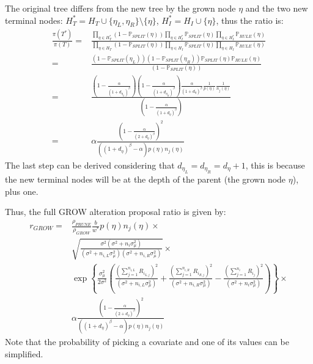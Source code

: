 \documentclass[11pt,a4paper]{article}
\newcommand{\prob}{\mathbb{P}}
\begin{document}
The original tree differs from the new tree by the grown node $\eta$ and the two new terminal nodes: $H_T^* = H_T \cup \{\eta_L, \eta_R\} \setminus \{\eta\}$, $H_I^* = H_I \cup \{\eta\}$, thus the ratio is:
\begin{equation}
    \label{eq:grow_struct_ratio}
    \begin{split}
        \frac{\pi(T^*)}{\pi(T)} = & \frac{\prod_{\eta \in H_T^*} (1 - \prob_{SPLIT}(\eta)) \prod_{\eta \in H_I^*} \prob_{SPLIT}(\eta)\prod_{\eta \in H_I^*} \prob_{RULE}(\eta)}{\prod_{\eta \in H_T} (1 - \prob_{SPLIT}(\eta)) \prod_{\eta \in H_I} \prob_{SPLIT}(\eta)\prod_{\eta \in H_I} \prob_{RULE}(\eta)} \\
        =                         & \frac{(1-\prob_{SPLIT}(\eta_L))(1-\prob_{SPLIT}(\eta_R))\prob_{SPLIT}(\eta)\prob_{RULE}(\eta)}{(1-\prob_{SPLIT}(\eta))}                                                                                                                                                     \\
        =                         & \frac{\left(1 - \frac{\alpha}{(1 + d_{\eta_L})^\beta}\right)\left(1 - \frac{\alpha}{(1 + d_{\eta_R})^\beta}\right)\frac{\alpha}{(1 + d_{\eta})^\beta}\frac{1}{p(\eta)}\frac{1}{n_j(\eta)}}{\left(1 - \frac{\alpha}{(1 + d_{\eta})^\beta}\right)}                            \\
        =                         & \alpha \frac{\left(1 - \frac{\alpha}{(2 + d_{\eta})^\beta}\right)^2}{\left((1+d_\eta)^\beta - \alpha\right) p(\eta) n_j(\eta)}
    \end{split}
\end{equation}
The last step can be derived considering that $d_{\eta_L} = d_{\eta_R} = d_\eta + 1$, this is because the new terminal nodes will be at the depth of the parent (the grown node $\eta$), plus one.

Thus, the full GROW alteration proposal ratio is given by:
\begin{equation}
    \label{eq:grow_ratio}
    \begin{split}
        r_{GROW} = & \frac{\rho_{PRUNE}}{\rho_{GROW}} \frac{b}{w^*}{p(\eta)n_{j}(\eta)} \times                                                      \\
                   & \sqrt{\frac{\sigma^2(\sigma^2 + n_i \sigma^2_\mu)}{(\sigma^2 + n_{i,L}\sigma^2_\mu)(\sigma^2 + n_{i,R}\sigma^2_\mu)}} \times   \\ & \exp\left\{\frac{\sigma_\mu^2}{2\sigma^2}\left(\frac{\left(\sum_{j=1}^{n_{i,L}}R_{i_{L,j}}\right)^2}{(\sigma^2 + n_{i,L}\sigma^2_\mu)} + \frac{\left(\sum_{j=1}^{n_{i,R}}R_{i_{R,j}}\right)^2}{(\sigma^2 + n_{i,R}\sigma^2_\mu) }-\frac{\left(\sum_{j=1}^{n_{i}}R_{i_{j}}\right)^2}{(\sigma^2 + n_{i}\sigma^2_\mu)}\right)\right\} \times \\
                   & \alpha \frac{\left(1 - \frac{\alpha}{(2 + d_{\eta})^\beta}\right)^2}{\left((1+d_\eta)^\beta - \alpha\right) p(\eta) n_j(\eta)}
    \end{split}
\end{equation}
Note that the probability of picking a covariate and one of its values can be simplified.
\end{document}
